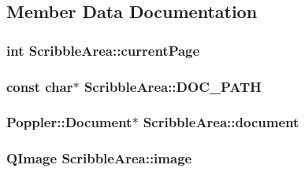 \subsection{Member Data Documentation}
\hypertarget{classScribbleArea_aeb25d61ec956c4e0be05047c14491923}{
\subsubsection[{currentPage}]{\setlength{\rightskip}{0pt plus 5cm}int {\bf ScribbleArea::currentPage}}}
\label{classScribbleArea_aeb25d61ec956c4e0be05047c14491923}
\hypertarget{classScribbleArea_a5e555edb58a131ec02ea120bf4c8fd27}{
\subsubsection[{DOC\_\-PATH}]{\setlength{\rightskip}{0pt plus 5cm}const char$\ast$ {\bf ScribbleArea::DOC\_\-PATH}}}
\label{classScribbleArea_a5e555edb58a131ec02ea120bf4c8fd27}
\hypertarget{classScribbleArea_a5b8a8e5a70cde0078bb60fad3483e54f}{
\subsubsection[{document}]{\setlength{\rightskip}{0pt plus 5cm}Poppler::Document$\ast$ {\bf ScribbleArea::document}}}
\label{classScribbleArea_a5b8a8e5a70cde0078bb60fad3483e54f}
\hypertarget{classScribbleArea_ae55058216a87aeee72bcb1220bc3a89d}{
\subsubsection[{image}]{\setlength{\rightskip}{0pt plus 5cm}QImage {\bf ScribbleArea::image}}}
\label{classScribbleArea_ae55058216a87aeee72bcb1220bc3a89d}
